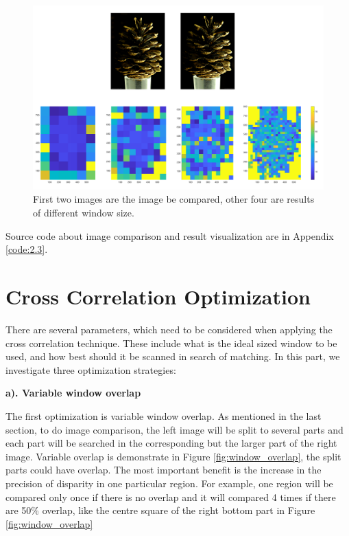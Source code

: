 \begin{figure}[h!]
	\centering
	\includegraphics[width=1\linewidth]{figures/part2/img_cmp1}
	\caption{First two images are the image be compared, other four are results of different window size.}
	\label{fig:img_cmp1}
\end{figure}

Source code about image comparison and result visualization are in Appendix \ref{code:2.3}.

\section{Cross Correlation Optimization}

There are several parameters, which need to be considered when applying the cross correlation technique. These include what is the ideal sized window to be used, and how best should it be scanned in search of matching. In this part, we investigate three optimization strategies:

\textbf{a). Variable window overlap}

The first optimization is variable window overlap. As mentioned in the last section, to do image comparison, the left image will be split to several parts and each part will be searched in the corresponding but the larger part of the right image. Variable overlap is demonstrate in Figure \ref{fig:window_overlap}, the split parts could have overlap. The most important benefit is the increase in the precision of disparity in one particular region. For example, one region will be compared only once if there is no overlap and it will compared 4 times if there are 50\% overlap, like the centre square of the right bottom part in Figure \ref{fig:window_overlap}

